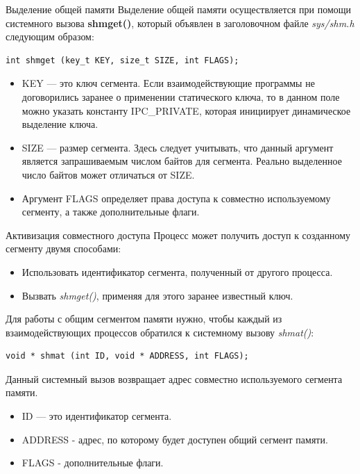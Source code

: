 \documentclass[xcolor=table]{beamer}
\begin{document}
\begin{frame}[fragile]{Выделение общей памяти}
	Выделение общей памяти осуществляется при помощи системного вызова \textbf{shmget()}, который объявлен в заголовочном файле \textit{sys/shm.h} следующим образом:
	\begin{verbatim}
int shmget (key_t KEY, size_t SIZE, int FLAGS);
	\end{verbatim}
	\begin{itemize}
		\item KEY — это ключ сегмента. Если взаимодействующие программы не договорились заранее о применении статического ключа, то в данном поле можно указать константу IPC\_PRIVATE, которая инициирует динамическое выделение ключа.
		\item SIZE — размер сегмента. Здесь следует учитывать, что данный аргумент является запрашиваемым числом байтов для сегмента. Реально выделенное число байтов может отличаться от SIZE.
		\item Аргумент FLAGS определяет права доступа к совместно используемому сегменту, а также дополнительные флаги.
	\end{itemize}
\end{frame}

\begin{frame}[fragile]{Активизация совместного доступа}
	Процесс может получить доступ к созданному сегменту двумя способами:
	\begin{itemize}
		\item Использовать идентификатор сегмента, полученный от другого процесса.
		\item Вызвать \textit{shmget()}, применяя для этого заранее известный ключ.
	\end{itemize}
	Для работы с общим сегментом памяти нужно, чтобы каждый из взаимодействующих процессов обратился к системному вызову \textit{shmat()}:
	\begin{verbatim}
void * shmat (int ID, void * ADDRESS, int FLAGS);
	\end{verbatim}
	Данный системный вызов возвращает адрес совместно используемого сегмента памяти. 
	\begin{itemize}
		\item ID — это идентификатор сегмента. 
		\item ADDRESS - адрес, по которому будет доступен общий сегмент памяти. 
		\item FLAGS - дополнительные флаги.
	\end{itemize}
\end{frame}
\end{document}
